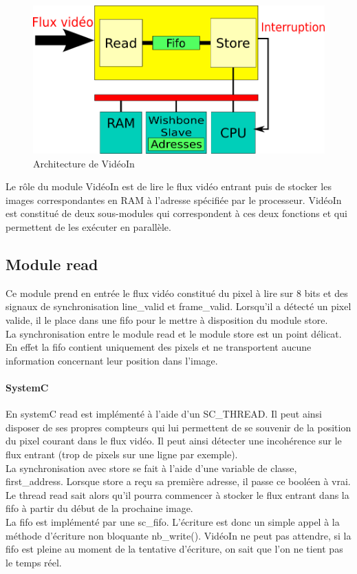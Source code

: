 \documentclass[a4paper,12pt]{report}
\begin{document}
\begin{figure}[!h]
	\centering
	\includegraphics[scale = 0.5]{video_in.png}
	\caption{Architecture de VidéoIn}
\end{figure}

Le rôle du module VidéoIn est de lire le flux vidéo entrant puis de stocker les images correspondantes en RAM à l'adresse spécifiée par le processeur.
VidéoIn est constitué de deux sous-modules qui correspondent à ces deux fonctions et qui permettent de les exécuter en parallèle. 


\subsection{Module read}
Ce module prend en entrée le flux vidéo constitué du pixel à lire sur 8 bits et des signaux de synchronisation line\_valid et frame\_valid.
Lorsqu'il a détecté un pixel valide, il le place dans une fifo pour le mettre à disposition du module store.\\
La synchronisation entre le module read et le module store est un point délicat. 
En effet la fifo contient uniquement des pixels et ne transportent aucune information concernant leur position dans l'image. 

\paragraph{SystemC}
En systemC read est implémenté à l'aide d'un SC\_THREAD. 
Il peut ainsi disposer de ses propres compteurs qui lui permettent de se souvenir de la position
du pixel courant dans le flux vidéo.
Il peut ainsi détecter une incohérence sur le flux entrant (trop de pixels sur une ligne par exemple).\\ 
La synchronisation avec store se fait à l'aide d'une variable de classe, first\_address. 
Lorsque store a reçu sa première adresse, il passe ce booléen à vrai.
Le thread read sait alors qu'il pourra commencer à stocker le flux entrant dans la fifo à partir du début de la prochaine image.\\
La fifo est implémenté par une sc\_fifo. 
L'écriture est donc un simple appel à la méthode d'écriture non bloquante nb\_write().
VidéoIn ne peut pas attendre,
si la fifo est pleine au moment de la tentative d'écriture, on sait que l'on ne tient pas le temps réel. 
\end{document}
